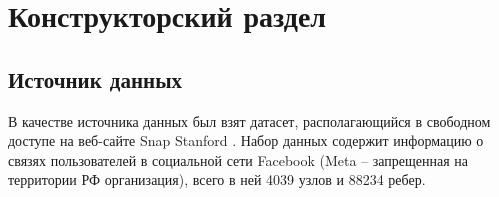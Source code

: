 \section{Конструкторский раздел}

\subsection{Источник данных}

В качестве источника данных был взят датасет, располагающийся в свободном доступе на веб-сайте Snap Stanford \cite{dataset}. Набор данных содержит информацию о связях пользователей в социальной сети Facebook (Meta -- запрещенная на территории РФ организация), всего в ней 4039 узлов и 88234 ребер.

\pagebreak